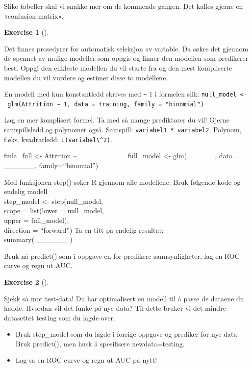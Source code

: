 \documentclass[
  letterpaper,
  DIV=11,
  numbers=noendperiod]{scrreprt}
\providecommand{\tightlist}{%
  \setlength{\itemsep}{0pt}\setlength{\parskip}{0pt}}\usepackage{longtable,booktabs,array}
\theoremstyle{definition}
\newtheorem{exercise}{Exercise}[chapter]
\theoremstyle{remark}
\begin{document}
Slike tabeller skal vi snakke mer om de kommende gangen. Det kalles
gjerne en «confusion matrix».

\leavevmode{}%
\begin{exercise}[]\label{exr-stepw1}

Det finnes prosedyrer for automatisk seleksjon av variable. Da søkes det
gjennom de spennet av mulige modeller som oppgis og finner den modellen
som predikerer best. Oppgi den enkleste modellen du vil starte fra og
den mest kompliserte modellen du vil vurdere og estimer disse to
modellene.

\end{exercise}

En modell med kun konstantledd skrives med \texttt{\textasciitilde{}} 1
i formelen slik:
\texttt{null\_model\ \textless{}-\ glm(Attrition\ \textasciitilde{}\ 1,\ data\ =\ training,\ family\ =\ "binomial")}

Lag en mer komplisert formel. Ta med så mange prediktorer du vil! Gjerne
samspillsledd og polynomer også. Samspill:
\texttt{variabel1\ *\ variabel2}. Polynom, f.eks. kvadratledd:
\texttt{I(variabel\textbackslash{}\^{}2)}.

fmla\_full \textless- Attrition \textasciitilde{} \_\_\_\_\_\_\_\_\_
full\_model \textless- glm(\_\_\_\_\_ , data = \_\_\_\_\_\_,
family=``binomial'')

Med funksjonen step() søker R gjennom alle modellene. Bruk følgende kode
og endelig modell\\
step\_model \textless- step(null\_model,\\
scope = list(lower = null\_model,\\
upper = full\_model),\\
direction = ``forward'') Ta en titt på endelig resultat:\\
summary( \_\_\_\_\_\_ )

Bruk nå predict() som i oppgave en for predikere sannsynligheter, lag en
ROC curve og regn ut AUC.

\leavevmode{}%
\begin{exercise}[]\label{exr-stepw-test}

Sjekk så mot test-data! Du har optimalisert en modell til å passe de
dataene du hadde. Hvordan vil det funke på nye data? Til dette bruker vi
det mindre datasettet testing som du lagde over.

\begin{itemize}
\tightlist
\item
  Bruk step\_model som du lagde i forrige oppgave og prediker for nye
  data. Bruk predict(), men husk å spesifisere newdata=testing.\\
\item
  Lag så en ROC curve og regn ut AUC på nytt!
\end{itemize}

\end{exercise}
\end{document}
